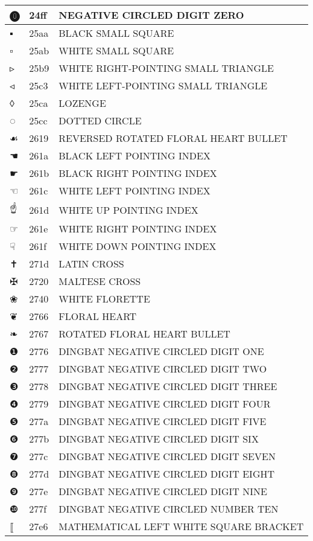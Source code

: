 \documentclass[12pt,letterpaper,openany]{book}
\begin{document}
\begin{center}
\begin{supertabular}{|m{0.25in}|m{0.5in}|m{4in}|}
⓿ & 24ff & NEGATIVE CIRCLED DIGIT ZERO\\\hline
▪ & 25aa & BLACK SMALL SQUARE\\\hline
▫ & 25ab & WHITE SMALL SQUARE\\\hline
▹ & 25b9 & WHITE RIGHT-POINTING SMALL TRIANGLE\\\hline
◃ & 25c3 & WHITE LEFT-POINTING SMALL TRIANGLE\\\hline
◊ & 25ca & LOZENGE\\\hline
◌ & 25cc & DOTTED CIRCLE\\\hline
☙ & 2619 & REVERSED ROTATED FLORAL HEART BULLET\\\hline
☚ & 261a & BLACK LEFT POINTING INDEX\\\hline
☛ & 261b & BLACK RIGHT POINTING INDEX\\\hline
☜ & 261c & WHITE LEFT POINTING INDEX\\\hline
☝ & 261d & WHITE UP POINTING INDEX\\\hline
☞ & 261e & WHITE RIGHT POINTING INDEX\\\hline
☟ & 261f & WHITE DOWN POINTING INDEX\\\hline
✝ & 271d & LATIN CROSS\\\hline
✠ & 2720 & MALTESE CROSS\\\hline
❀ & 2740 & WHITE FLORETTE\\\hline
❦ & 2766 & FLORAL HEART\\\hline
❧ & 2767 & ROTATED FLORAL HEART BULLET\\\hline
❶ & 2776 & DINGBAT NEGATIVE CIRCLED DIGIT ONE\\\hline
❷ & 2777 & DINGBAT NEGATIVE CIRCLED DIGIT TWO\\\hline
❸ & 2778 & DINGBAT NEGATIVE CIRCLED DIGIT THREE\\\hline
❹ & 2779 & DINGBAT NEGATIVE CIRCLED DIGIT FOUR\\\hline
❺ & 277a & DINGBAT NEGATIVE CIRCLED DIGIT FIVE\\\hline
❻ & 277b & DINGBAT NEGATIVE CIRCLED DIGIT SIX\\\hline
❼ & 277c & DINGBAT NEGATIVE CIRCLED DIGIT SEVEN\\\hline
❽ & 277d & DINGBAT NEGATIVE CIRCLED DIGIT EIGHT\\\hline
❾ & 277e & DINGBAT NEGATIVE CIRCLED DIGIT NINE\\\hline
❿ & 277f & DINGBAT NEGATIVE CIRCLED NUMBER TEN\\\hline
⟦ & 27e6 & MATHEMATICAL LEFT WHITE SQUARE BRACKET\\\hline

\end{supertabular}
\end{center}
\end{document}
